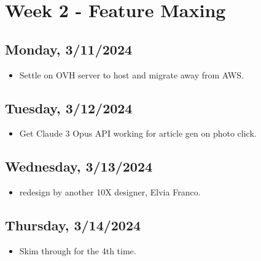 \newpage
\section{Week 2 - Feature Maxing}

\subsection*{Monday, 3/11/2024}
\begin{itemize}
    \item Settle on OVH server to host and migrate away from AWS.
\end{itemize}

\subsection*{Tuesday, 3/12/2024}
\begin{itemize}
    \item Get Claude 3 Opus API working for article gen on photo click.
\end{itemize}

\subsection*{Wednesday, 3/13/2024}
\begin{itemize}
    \item redesign by another 10X designer, Elvia Franco. 
\end{itemize}

\subsection*{Thursday, 3/14/2024}
\begin{itemize}
    \item Skim through \cite{huyen2022designing} for the 4th time.
\end{itemize}

